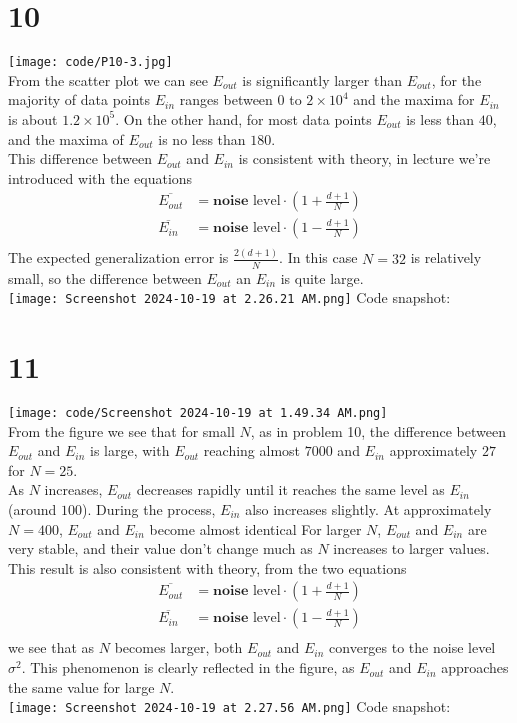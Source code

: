 \documentclass[11pt]{article}
\theoremstyle{definition}
\begin{document}
\section*{10}
\texttt{[image: code/P10-3.jpg]} \\ 
From the scatter plot we can see $E_{out}$ is significantly larger than $E_{out} $, for the majority of data points $E_{in}$ ranges between $0$ to $2\times 10^4$ and the maxima for $E_{in}$ is about $1.2\times 10^5$. On the other hand, for most data points $E_{out}$ is less than $40$, and the maxima of $E_{out}$ is no less than $180$. \\ 
This difference between $E_{out}$ and $E_{in}$ is consistent with theory, in lecture we're introduced with the equations
\begin{align*}
  \overline{E_{out}} &= \textbf{noise }\text{level}\cdot (1 + \frac{d + 1}{N}) \\
  \overline{E_{in}} &= \textbf{noise }\text{level}\cdot (1 - \frac{d + 1}{N}) \\
\end{align*}
The expected generalization error is $\frac{2(d + 1)}{N}$. In this case $N = 32$ is relatively small, so the difference between $E_{out}$ an $E_{in}$ is quite large. \\ 
\texttt{[image: Screenshot 2024-10-19 at 2.26.21 AM.png]}
Code snapshot: \\ 
\newpage
\section*{11}
\texttt{[image: code/Screenshot 2024-10-19 at 1.49.34 AM.png]} \\ 
From the figure we see that for small $N$, as in problem 10, the difference between $E_{out}$ and $E_{in}$ is large, with $E_{out}$ reaching almost $7000$ and $E_{in}$ approximately $27$ for $N = 25$. \\ 
As $N$ increases, $E_{out}$ decreases rapidly until it reaches the same level as $E_{in}$(around $100$). During the process, $E_{in}$ also increases slightly. At approximately $N = 400$, $E_{out}$ and $E_{in}$ become almost identical
For larger $N$, $E_{out}$ and $E_{in}$ are very stable, and their value don't change much as $N$ increases to larger values. \\ 
This result is also consistent with theory, from the two equations
\begin{align*}
  \overline{E_{out}} &= \textbf{noise }\text{level}\cdot (1 + \frac{d + 1}{N}) \\
  \overline{E_{in}} &= \textbf{noise }\text{level}\cdot (1 - \frac{d + 1}{N}) \\
\end{align*}
we see that as $N$ becomes larger, both $E_{out}$ and $E_{in}$ converges to the noise level $\sigma^2$. This phenomenon is clearly reflected in the figure, as $E_{out}$ and $E_{in}$ approaches the same value for large $N$. \\ 
\texttt{[image: Screenshot 2024-10-19 at 2.27.56 AM.png]}
Code snapshot: \\ 
\newpage
\end{document}
